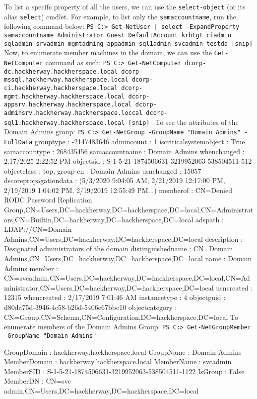 {To list a specifc property of all the users, we can use the \texttt{select-object} (or its alias \texttt{select}) cmdlet. For example, to list only the \texttt{samaccountname}, run the following command below:
\texttt{PS C:\MyDrive\MyTools> Get-NetUser | select -ExpandProperty samaccountname
Administrator
Guest
DefaultAccount
krbtgt
ciadmin
sqladmin
srvadmin
mgmtadming
appadmin
sql1admin
svcadmin
testda
[snip]
}
Now, to enumerate member machines in the domain, we can use the \texttt{Get-NetComputer} command as such:
\texttt{PS C:\MyDrive\MyTools> Get-NetComputer
dcorp-dc.hackherway.hackherspace.local
dcorp-mssql.hackherway.hackherspace.local
dcorp-ci.hackherway.hackherspace.local
dcorp-mgmt.hackherway.hackherspace.local
dcorp-appsrv.hackherway.hackherspace.local
dcorp-adminsrv.hackherway.hackherspace.loccal
dcorp-sql1.hackherway.hackherspace.local
[snip]
}
To see the attributes of the Domain Admins group:
\texttt{PS C:\MyDrive\MyTools> Get-NetGroup -GroupName "Domain Admins" -FullData}
grouptype               : -2147483646
admincount              : 1
iscriticalsystemobject  : True
samaccountype           : 268435456
samaccountname          : Domain Admins
whenchanged             : 2.17/2025 2:22:52 PM
objectsid               : S-1-5-21-1874506631-3219952063-538504511-512
objectclass             : {top, group}
cn                      : Domain Admins
usnchanged              : 15057
dscorepropagationdata   : (5/3/2020 9:04:05 AM, 2/21/2019 12:17:00 PM, 2/19/2019 1:04:02 PM, 2/19/2019 12:55:49 PM...)
memberof                : {CN=Denied RODC Password Replication Group,CN=Users,DC=hackherway,DC=hackherspace,DC=local,CN=Administrators,CN=Builtin,DC=hackherway,DC=hackherspace,DC=local}
adspath                 : LDAP://CN=Domain Admins,CN=Users,DC=hackherway,DC=hackherspace,DC=local
description             : Designated administrators of the domain
distinguishedname       : CN=Domain Admins,CN=Users,DC=hackherway,DC=hackherspace,DC=local
name                    : Domain Admins
member                  : {CN=svcadmin,CN=Users,DC=hackherway,DC=hackherspace,DC=local,CN=Administrator,CN=Users,DC=hackherway,DC=hackherspace,DC=local}
usncreated              : 12315
whencreated             : 2/17/2019 7:01:46 AM
instancetype            : 4
objectguid              : d80da75d-3946-4c58-b26d-5406e67bbc10
objectcategory          : CN=Group,CN=Schema,CN=Configuration,DC=hackherspace,DC=local
To enumerate members of the Domain Admins Group:
\texttt{PS C:\MyDrive\MyTools> Get-NetGroupMember -GroupName "Domain Admins"}

GroupDomain         : hackherway.hackherspace.local
GroupName           : Domain Admins
MemberDomain        : hackherway.hackherspace.local
MemberName          : svcadmin
MemberSID           : S-1-5-21-1874506631-3219952063-538504511-1122
IsGroup             : False
MemberDN            : CN=svc admin,CN=Users,DC=hackherway,DC=hackherspace,DC=local

}
